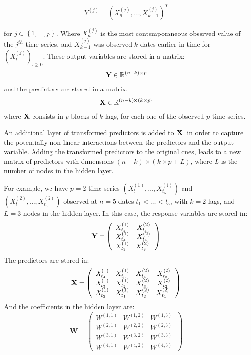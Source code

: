 \begin{equation}
Y^{(j)} = \left(X^{(j)}_n, \ldots, X^{(j)}_{k+1} \right)^T
\end{equation}

for $j \in \left\lbrace 1, \ldots,
p \right\rbrace$. Where $X^{(j)}_n$ is the most contemporaneous observed value
of the $j^{th}$ time series, and $X^{(j)}_{k+1}$ was observed $k$ dates earlier
in time for $(X^{(j)}_t)_{t \geq 0}$. These output variables are stored in a
matrix: $$ {\bf Y} \in \mathbb{R}^{(n-k) \times p} $$ and the predictors are
stored in a matrix: $$ {\bf X} \in \mathbb{R}^{(n-k) \times (k \times p)} $$
where ${\bf X}$ consists in $p$ blocks of $k$ lags, for each one of the observed
$p$ time series.

\medskip

An additional layer of transformed  predictors
is added to ${\bf X}$, in order to capture the potentially non-linear
interactions between the predictors and the output variable. Adding the transformed predictors to the original ones, leads to a new matrix of predictors with dimensions $(n-k) \times (k \times p + L)$, where $L$ is the number of nodes in the hidden layer.

\medskip

For example, we have $p = 2$ time series $(X^{(1)}_{t_1}, \ldots,  X^{(1)}_{t_5})$ and $(X^{(2)}_{t_1}, \ldots,  X^{(2)}_{t_5})$ observed at $n = 5$ dates $t_1 < \ldots < t_5$, with $k = 2$ lags, and $L = 3$ nodes in the hidden layer. In this case, the response variables are stored in:
$$
{\bf Y} = \left( {\begin{array}{cc} X^{(1)}_{t_5} &  X^{(2)}_{t_5}\\ X^{(1)}_{t_4} & X^{(2)}_{t_4} \\ X^{(1)}_{t_3} & X^{(2)}_{t_3}\      \end{array} } \right)
$$
The predictors are stored in:
$$
{\bf X} = \left( {\begin{array}{cccc} X^{(1)}_{t_4} & X^{(1)}_{t_3} & X^{(2)}_{t_4} & X^{(2)}_{t_3} \\ X^{(1)}_{t_3} & X^{(1)}_{t_2} & X^{(2)}_{t_3} & X^{(2)}_{t_2} \\ X^{(1)}_{t_2} & X^{(1)}_{t_1} & X^{(2)}_{t_2} & X^{(2)}_{t_1} \      \end{array} }\right)
$$
And the coefficients in the hidden layer are:
$$
\textbf{W} = \left( {\begin{array}{ccc} W^{(1, 1)} & W^{(1, 2)} & W^{(1, 3)}  \\ W^{(2, 1)} & W^{(2, 2)} & W^{(2, 3)}  \\ W^{(3, 1)} & W^{(3, 2)} & W^{(3, 3)} \\ W^{(4, 1)} & W^{(4, 2)} & W^{(4, 3)}  \      \end{array} }\right)
$$

